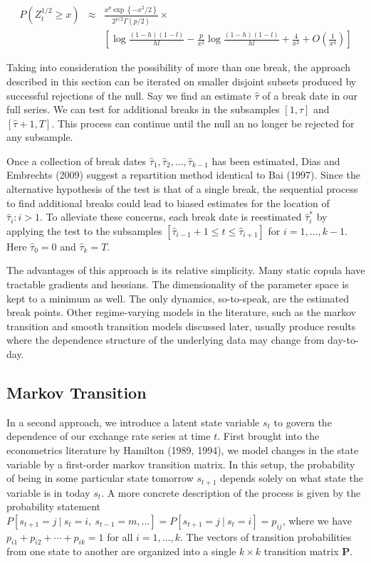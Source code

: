 \documentclass[12pt]{article}
\begin{document}
\begin{eqnarray}
P\left(Z_{t}^{1/2} \geq x\right) &\approx& \frac{x^{p} \exp\left\{-x^{2}/2\right\}}{2^{p/2}\Gamma \left(p/2\right)} \times  \\
                                 && \left[\log \frac{\left(1-h\right) \left(1-l\right)}{hl} - \frac{p}{x^{2}}\log \frac{\left(1-h\right)\left(1-l\right)}{hl} + \frac{4}{x^{2}} + O \left(\frac{1}{x^{4}}\right)\right]
\end{eqnarray}

Taking into consideration the possibility of more than one break, the
approach described in this section can be iterated on smaller disjoint
subsets produced by successful rejections of the null. Say we find an
estimate $\hat{\tau}$ of a break date in our full series. We can test for
additional breaks in the subsamples $\left[1, \hat{\tau}\right]$ and
$\left[\hat{\tau} + 1, T\right]$. This process can continue until the null 
an no longer be rejected for any subsample.

Once a collection of break dates
$\hat{\tau}_{1},\hat{\tau}_{2},...,\hat{\tau}_{k-1}$ has been estimated,
Dias and Embrechts (2009) suggest a repartition method identical to Bai (1997).
Since the alternative hypothesis of the test is that of a single break,
the sequential process to find additional breaks could lead to biased
estimates for the location of $\hat{\tau}_{i}:i > 1$. To alleviate these
concerns, each break date is reestimated $\hat{\tau}_{i}^{\ast}$ by
applying the test to the subsamples
$\left[ \hat{\tau}_{i-1}+1\leq t\leq \hat{\tau}_{i+1}\right]$ for
$i=1,...,k-1$. Here $\hat{\tau}_{0} = 0$ and $\hat{\tau}_{k} = T$.

The advantages of this approach is its relative simplicity. Many static
copula have tractable gradients and hessians. The dimensionality of the parameter space is kept to a minimum as well. The only dynamics, so-to-speak, are the estimated break points. Other regime-varying models in the literature, such as the markov transition and smooth transition models discussed later, usually produce results where the dependence structure of the underlying data may change from day-to-day.

\subsection{Markov Transition}

In a second approach, we introduce a latent state variable $s_{t}$ to
govern the dependence of our exchange rate series at time $t$. First
brought into the econometrics literature by Hamilton (1989, 1994), we
model changes in the state variable by a first-order markov transition
matrix. In this setup, the probability of being in some particular state
tomorrow $s_{t+1}$ depends solely on what state the variable is in today
$s_{t}$. A more concrete description of the process is given by the
probability statement
$P\left[s_{t + 1} = j~|~s_{t}=i,~s_{t-1} = m,\ldots \right] = P\left[s_{t+1}=j~|~s_{t} = i\right] = p_{ij}$,
where we have $p_{i1} + p_{i2} + \cdots + p_{ik}=1$ for all $i = 1,...,k$.
The vectors of transition probabilities from one state to another are
organized into a single $k\times k$ transition matrix $\mathbf{P}$.
\end{document}
